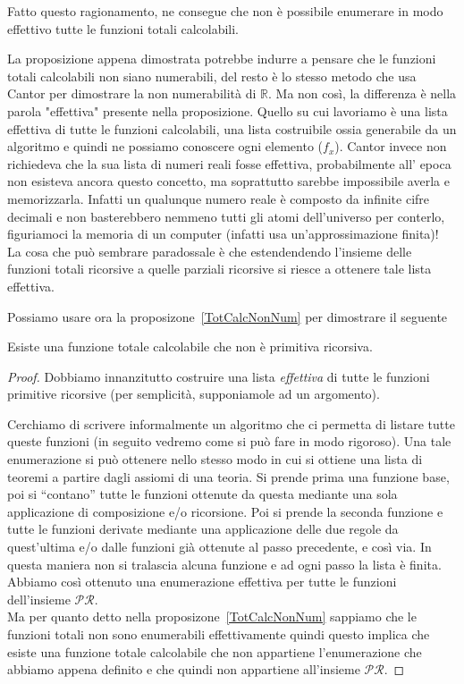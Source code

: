 Fatto questo ragionamento, ne consegue che non è possibile enumerare
in modo effettivo tutte le funzioni totali calcolabili.


La proposizione appena dimostrata potrebbe indurre a pensare che le funzioni totali calcolabili non siano numerabili, del resto è lo stesso metodo che usa Cantor per dimostrare la non numerabilità di $\mathbb{R}$. Ma non  così, la differenza è nella parola "effettiva" presente nella proposizione. Quello su cui lavoriamo è una lista effettiva di tutte le funzioni calcolabili, una lista costruibile ossia generabile da un algoritmo e quindi ne possiamo conoscere ogni elemento ($f_x$). 
Cantor invece non richiedeva che la sua lista di numeri reali fosse effettiva, probabilmente all' epoca non esisteva ancora questo concetto, ma soprattutto sarebbe impossibile averla e memorizzarla. Infatti un qualunque numero reale è composto da infinite cifre decimali e non basterebbero nemmeno tutti gli atomi dell'universo per conterlo, figuriamoci la memoria di un computer (infatti usa un'approssimazione finita)!\\
La cosa che può sembrare paradossale è che estendendendo l'insieme delle funzioni totali ricorsive a quelle parziali ricorsive si riesce a ottenere tale lista effettiva.



Possiamo usare ora la proposizone~\ref{TotCalcNonNum} per dimostrare il seguente

\begin{thm}\label{diagRic} Esiste una funzione totale calcolabile che non
è primitiva ricorsiva.
\end{thm}

\begin{proof}
Dobbiamo innanzitutto costruire una lista \emph{effettiva} di tutte le
funzioni primitive ricorsive (per semplicit\`a, supponiamole ad un
argomento).

Cerchiamo di scrivere informalmente un algoritmo che ci permetta di
listare tutte queste funzioni (in seguito vedremo come si pu\`o fare
in modo rigoroso).  Una tale enumerazione si pu\`o ottenere nello
stesso modo in cui si ottiene una lista di teoremi a partire dagli
assiomi di una teoria. Si prende prima una funzione base, poi si
``contano'' tutte le funzioni ottenute da questa mediante una sola
applicazione di composizione e/o ricorsione. Poi si prende la seconda
funzione e tutte le funzioni derivate mediante una applicazione delle
due regole da quest'ultima e/o dalle funzioni gi\`a ottenute al passo
precedente, e cos\`i via. In questa maniera non si tralascia alcuna
funzione e ad ogni passo la lista \`e finita. Abbiamo cos\`i ottenuto
una enumerazione effettiva per tutte le funzioni dell'insieme
$\mathcal{PR}$.\\ Ma per quanto detto nella
proposizone~\ref{TotCalcNonNum} sappiamo che le funzioni totali non
sono enumerabili effettivamente quindi questo implica che esiste una
funzione totale calcolabile che non appartiene l'enumerazione che
abbiamo appena definito e che quindi non appartiene all'insieme
$\mathcal{PR}$.
\end{proof}

